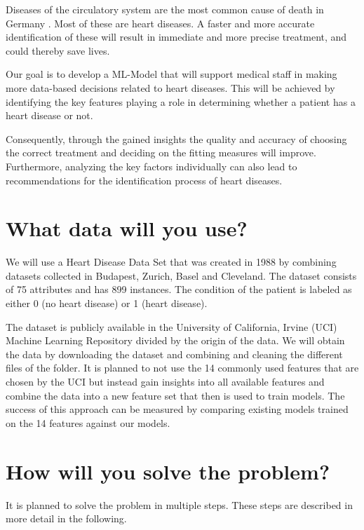 \documentclass[11pt,titlepage,oneside,openany]{book}
\begin{document}
Diseases of the circulatory system are the most common cause of death in Germany \citep{statistischesbundesamt2022}.
Most of these are heart diseases. A faster and more accurate identification of these will result in immediate and more precise treatment, and could thereby save lives.

Our goal is to develop a ML-Model that will support medical staff in making more data-based decisions related to heart diseases. This will be achieved by identifying the key features playing a role in determining whether a patient has a heart disease or not. 

Consequently, through the gained insights the quality and accuracy of choosing the correct treatment and deciding on the fitting measures will improve. Furthermore, analyzing the key factors individually can also lead to recommendations for the identification process of heart diseases. 


\section{What data will you use?}
\label{sec:data}

We will use a Heart Disease Data Set that was created in 1988 by combining datasets collected in Budapest, Zurich, Basel and Cleveland. The dataset consists of 75 attributes and has 899 instances. The condition of the patient is labeled as either 0 (no heart disease) or 1 (heart disease).

The dataset is publicly available in the University of California, Irvine (UCI) Machine Learning Repository \citep{janosi1988} divided by the origin of the data. We will obtain the data by downloading the dataset and combining and cleaning the different files of the folder. It is planned to not use the 14 commonly used features that are chosen by the UCI but instead gain insights into all available features and combine the data into a new feature set that then is used to train models. The success of this approach can be measured by comparing existing models trained on the 14 features against our models. 

\section{How will you solve the problem?}
\label{cha:solve}

It is planned to solve the problem in multiple steps. These steps are described in more detail in the following. 
\end{document}
